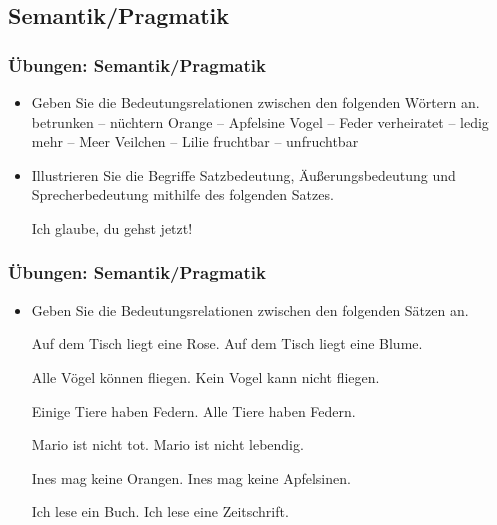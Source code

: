 \subsection{Semantik/Pragmatik}

\begin{frame}
\frametitle{Übungen: Semantik/Pragmatik}

\begin{itemize}
	\item Geben Sie die Bedeutungsrelationen zwischen den folgenden Wörtern an.
	\eal
	\ex betrunken -- nüchtern
	\ex Orange -- Apfelsine
	\ex Vogel -- Feder
	\ex verheiratet -- ledig
	\ex mehr -- Meer
	\ex Veilchen -- Lilie
	\ex fruchtbar -- unfruchtbar
	\zl
	
	\item Illustrieren Sie die Begriffe Satzbedeutung, Äußerungsbedeutung und Sprecherbedeutung mithilfe des folgenden Satzes.
	
	\ea Ich glaube, du gehst jetzt!
	\z
	
\end{itemize}

\end{frame}


\begin{frame}
\frametitle{Übungen: Semantik/Pragmatik}

\begin{itemize}
	\item Geben Sie die Bedeutungsrelationen zwischen den folgenden Sätzen an.
	
	\eal 
	\ex Auf dem Tisch liegt eine Rose.
	\ex Auf dem Tisch liegt eine Blume.
	\zl
	
	\eal 
	\ex Alle Vögel können fliegen.
	\ex Kein Vogel kann nicht fliegen.
	\zl
	
	\eal 
	\ex Einige Tiere haben Federn.
	\ex Alle Tiere haben Federn.
	\zl
	
	\eal 
	\ex Mario ist nicht tot.
	\ex Mario ist nicht lebendig.
	\zl
	
	\eal 
	\ex Ines mag keine Orangen.
	\ex Ines mag keine Apfelsinen.
	\zl
	
	\eal 
	\ex Ich lese ein Buch.
	\ex Ich lese eine Zeitschrift.
	\zl
	
\end{itemize}

\end{frame}


